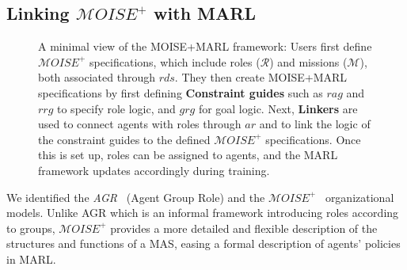 \documentclass[sigconf]{aamas}
\begin{document}
\subsection{Linking $\mathcal{M}OISE^+$ with MARL}

\begin{figure}[h!]
    \centering
    
    \caption{A minimal view of the MOISE+MARL framework: 
    Users first define $\mathcal{M}OISE^+$ specifications, which include roles ($\mathcal{R}$) and missions ($\mathcal{M}$), both associated through $rds$. They then create MOISE+MARL specifications by first defining \textbf{Constraint guides} such as $rag$ and $rrg$ to specify role logic, and $grg$ for goal logic. 
    Next, \textbf{Linkers} are used to connect agents with roles through $ar$ and to link the logic of the constraint guides to the defined $\mathcal{M}OISE^+$ specifications. Once this is set up, roles can be assigned to agents, and the MARL framework updates accordingly during training.
    }
    \label{fig:mm_synthesis}
\end{figure}

We identified the \textit{AGR}~\cite{ferber2003} (Agent Group Role) and the $\mathcal{M}OISE^+$~\cite{Hubner2007} organizational models. Unlike AGR which is an informal framework introducing roles according to groups, $\mathcal{M}OISE^+$ provides a more detailed and flexible description of the structures and functions of a MAS, easing a formal description of agents' policies in MARL.

\
\end{document}
